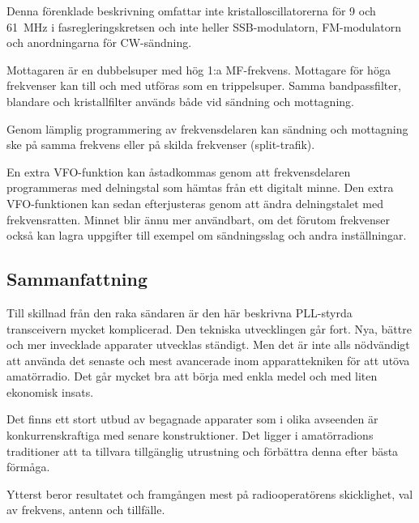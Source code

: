Denna förenklade beskrivning omfattar inte kristalloscillatorerna för 9 och
\qty{61}{\mega\hertz} i fasregleringskretsen och inte heller SSB-modulatorn,
FM-modulatorn och anordningarna för CW-sändning.

Mottagaren är en dubbelsuper med hög 1:a MF-frekvens.
Mottagare för höga frekvenser kan till och med utföras som en trippelsuper.
Samma bandpassfilter, blandare och kristallfilter används både vid sändning
och mottagning.

Genom lämplig programmering av frekvensdelaren kan sändning och
mottagning ske på samma frekvens eller på skilda frekvenser
(split-trafik).

En extra VFO-funktion kan åstadkommas genom att frekvensdelaren
programmeras med delningstal som hämtas från ett digitalt minne.
Den extra VFO-funktionen kan sedan efterjusteras genom att ändra
delningstalet med frekvensratten.
Minnet blir ännu mer användbart, om det förutom frekvenser också kan lagra
uppgifter till exempel om sändningsslag och andra inställningar.

\newpage %
\subsection{Sammanfattning}

Till skillnad från den raka sändaren är den här beskrivna PLL-styrda
transceivern mycket komplicerad.
Den tekniska utvecklingen går fort.
Nya, bättre och mer invecklade apparater utvecklas ständigt.
Men det är inte alls nödvändigt att använda det senaste och mest
avancerade inom apparattekniken för att utöva amatörradio.
Det går mycket bra att börja med enkla medel och med liten ekonomisk insats.

Det finns ett stort utbud av begagnade apparater som i olika avseenden
är konkurrenskraftiga med senare konstruktioner.
Det ligger i amatörradions traditioner att ta tillvara tillgänglig
utrustning och förbättra denna efter bästa förmåga.

Ytterst beror resultatet och framgången mest på radiooperatörens
skicklighet, val av frekvens, antenn och tillfälle.
